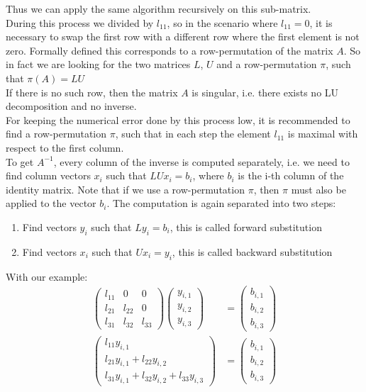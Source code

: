 Thus we can apply the same algorithm recursively on this sub-matrix.
\vspace{0.3cm}\\
During this process we divided by $l_{11}$, so in the scenario where $l_{11}=0$, it is necessary to swap the first row with a different row where the first element is not zero. Formally defined this corresponds to a row-permutation of the matrix $A$. So in fact we are looking for the two matrices $L$, $U$ and a row-permutation $\pi$, such that $\pi(A) = LU$\\  
If there is no such row, then the matrix $A$ is singular, i.e. there exists no LU decomposition and no inverse. \\
For keeping the numerical error done by this process low, it is recommended to find a row-permutation $\pi$, such that in each step the element $l_{11}$ is maximal with respect to the first column.
\vspace{0.3cm}\\
To get $A^{-1}$, every column of the inverse is computed separately, i.e. we need to find column vectors $x_i$ such that $LUx_i = b_i$, where $b_i$ is the i-th column of the identity matrix. Note that if we use a row-permutation $\pi$, then $\pi$ must also be applied to the vector $b_i$. The computation is again separated into two steps:\\
\begin{enumerate}
	\item Find vectors $y_i$ such that $Ly_i = b_i$, this is called forward substitution
	\item Find vectors $x_i$ such that $Ux_i = y_i$, this is called backward substitution
\end{enumerate}
With our example:
\begin{align*}
	\begin{pmatrix} l_{11}  & 0 & 0\\
	l_{21} & l_{22} & 0\\
	l_{31} & l_{32} & l_{33}
	\end{pmatrix} \begin{pmatrix} y_{i,1} \\ y_{i,2} \\ y_{i,3}	\end{pmatrix}
	& = \begin{pmatrix}
	b_{i,1} \\ b_{i,2} \\ b_{i,3}
	\end{pmatrix} \\
	\begin{pmatrix}
	l_{11} y_{i,1}\\ l_{21} y_{i,1} + l_{22} y_{i,2}\\
	l_{31} y_{i,1} + l_{32} y_{i,2} + l_{33} y_{i,3}
	\end{pmatrix}	& = \begin{pmatrix}
	b_{i,1} \\ b_{i,2} \\ b_{i,3}
	\end{pmatrix} \\
\end{align*}
